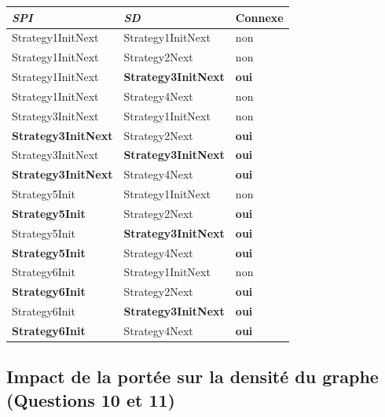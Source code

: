 \documentclass[a4paper]{article}
\begin{document}
\begin{center}
\begin{tabular}{| l | l | l |}
  \hline
  \textsl{SPI} & \textsl{SD} & \textbf{Connexe}\\
  \hline
  Strategy1InitNext & Strategy1InitNext & non\\
  \hline
  Strategy1InitNext & Strategy2Next &  non\\
  \hline
  Strategy1InitNext & \textbf{Strategy3InitNext} & \textbf{oui}\\
  \hline
  Strategy1InitNext & Strategy4Next & non \\
  \hline
  Strategy3InitNext & Strategy1InitNext & non \\
  \hline
  \textbf{Strategy3InitNext} & Strategy2Next & \textbf{oui} \\
  \hline
  Strategy3InitNext & \textbf{Strategy3InitNext} & \textbf{oui}\\
  \hline
  \textbf{Strategy3InitNext} & Strategy4Next & \textbf{oui}\\
  \hline
  Strategy5Init & Strategy1InitNext & non \\
  \hline
  \textbf{Strategy5Init} & Strategy2Next & \textbf{oui}\\
  \hline
  Strategy5Init & \textbf{Strategy3InitNext} & \textbf{oui} \\
  \hline
  \textbf{Strategy5Init} & Strategy4Next & \textbf{oui} \\
  \hline
  Strategy6Init & Strategy1InitNext & non\\
  \hline
  \textbf{Strategy6Init} & Strategy2Next & \textbf{oui} \\
  \hline
  Strategy6Init & \textbf{Strategy3InitNext} & \textbf{oui}\\
  \hline
  \textbf{Strategy6Init} & Strategy4Next & \textbf{oui}\\
  \hline
\end{tabular}
\end{center}


\pagebreak
\subsection{Impact de la portée sur la densité du graphe (Questions 10
  et 11)}
\end{document}
